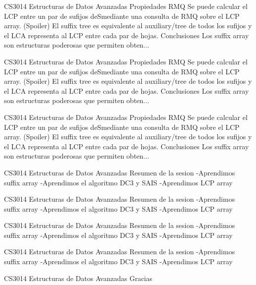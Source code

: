 \begin{description}[leftmargin=!,labelwidth=4.2em,style=nextline]
\item[Pag. 74] CS3014 Estructuras de Datos Avanzadas Propiedades RMQ Se puede calcular el LCP entre un par de sufijos deSmediante una consulta de RMQ sobre el LCP array. (Spoiler) El suffix tree es equivalente al auxiliary/tree de todos los sufijos y el LCA representa al LCP entre cada par de hojas. Conclusiones Los suffix array son estructuras poderosas que permiten obten...
\item[Pag. 75] CS3014 Estructuras de Datos Avanzadas Propiedades RMQ Se puede calcular el LCP entre un par de sufijos deSmediante una consulta de RMQ sobre el LCP array. (Spoiler) El suffix tree es equivalente al auxiliary/tree de todos los sufijos y el LCA representa al LCP entre cada par de hojas. Conclusiones Los suffix array son estructuras poderosas que permiten obten...
\item[Pag. 76] CS3014 Estructuras de Datos Avanzadas Propiedades RMQ Se puede calcular el LCP entre un par de sufijos deSmediante una consulta de RMQ sobre el LCP array. (Spoiler) El suffix tree es equivalente al auxiliary/tree de todos los sufijos y el LCA representa al LCP entre cada par de hojas. Conclusiones Los suffix array son estructuras poderosas que permiten obten...
\item[Pag. 77] CS3014 Estructuras de Datos Avanzadas Resumen de la sesion -Aprendimos suffix array -Aprendimos el algoritmo DC3 y SAIS -Aprendimos LCP array
\item[Pag. 78] CS3014 Estructuras de Datos Avanzadas Resumen de la sesion -Aprendimos suffix array -Aprendimos el algoritmo DC3 y SAIS -Aprendimos LCP array
\item[Pag. 79] CS3014 Estructuras de Datos Avanzadas Resumen de la sesion -Aprendimos suffix array -Aprendimos el algoritmo DC3 y SAIS -Aprendimos LCP array
\item[Pag. 80] CS3014 Estructuras de Datos Avanzadas Resumen de la sesion -Aprendimos suffix array -Aprendimos el algoritmo DC3 y SAIS -Aprendimos LCP array
\item[Pag. 81] CS3014 Estructuras de Datos Avanzadas Gracias
\end{description}
